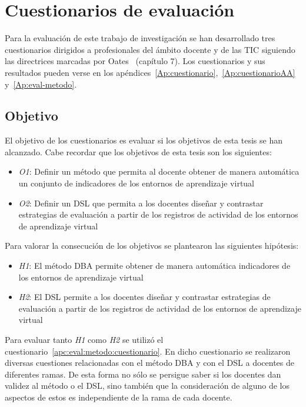 \section{Cuestionarios de evaluación}

	Para la evaluación de este trabajo de investigación se han desarrollado tres cuestionarios dirigidos a profesionales del ámbito docente y de las TIC siguiendo las directrices marcadas por Oates~\cite{oates2006researching} (capítulo 7). Los cuestionarios y sus resultados pueden verse en los apéndices~\ref{Ap:cuestionario},~\ref{Ap:cuestionarioAA} y~\ref{Ap:eval-metodo}. 


\subsection{Objetivo}

El objetivo de los cuestionarios es evaluar si los objetivos de esta tesis se han alcanzado. Cabe recordar que los objetivos de esta tesis son los siguientes:

\begin{itemize}
\item \emph{O1}: Definir un método que permita al docente obtener de manera automática un conjunto de indicadores de los entornos de aprendizaje virtual
\item \emph{O2}: Definir un DSL que permita a los docentes diseñar y contrastar estrategias de evaluación a partir de los registros de actividad de los entornos de aprendizaje virtual
\end{itemize}

Para valorar la consecución de los objetivos se plantearon las siguientes hipótesis:

\begin{itemize}
\item \emph{H1}: El método DBA permite obtener de manera automática indicadores de los entornos de aprendizaje virtual
\item \emph{H2}: El DSL permite a los docentes diseñar y contrastar estrategias de evaluación a partir de los registros de actividad de los entornos de aprendizaje virtual
\end{itemize}

Para evaluar tanto \emph{H1} como \emph{H2} se utilizó el cuestionario~\ref{apc:eval:metodo:cuestionario}. En dicho cuestionario se realizaron diversas cuestiones relacionadas con el método DBA y con el DSL a docentes de diferentes ramas. De esta forma no sólo se persigue saber si los docentes dan validez al método o el DSL, sino también que la consideración de alguno de los aspectos de estos es independiente de la rama de cada docente.

